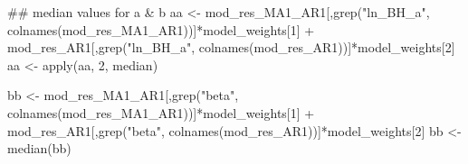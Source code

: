 \documentclass[
  11pt,
]{article}
\newenvironment{Shaded}{}{}
\newcommand{\CommentTok}[1]{\textcolor[rgb]{0.00,0.50,0.00}{#1}}
\newcommand{\DecValTok}[1]{#1}
\newcommand{\KeywordTok}[1]{\textcolor[rgb]{0.00,0.00,1.00}{#1}}
\newcommand{\NormalTok}[1]{#1}
\newcommand{\OperatorTok}[1]{#1}
\newcommand{\StringTok}[1]{\textcolor[rgb]{0.00,0.50,0.50}{#1}}
\begin{document}
\begin{Shaded}
\begin{Highlighting}[]
\CommentTok{## median values for a & b}
\NormalTok{aa <-}\StringTok{ }\NormalTok{mod_res_MA1_AR1[,}\KeywordTok{grep}\NormalTok{(}\StringTok{"ln_BH_a"}\NormalTok{, }\KeywordTok{colnames}\NormalTok{(mod_res_MA1_AR1))]}\OperatorTok{*}\NormalTok{model_weights[}\DecValTok{1}\NormalTok{] }\OperatorTok{+}\StringTok{ }\NormalTok{mod_res_AR1[,}\KeywordTok{grep}\NormalTok{(}\StringTok{"ln_BH_a"}\NormalTok{, }\KeywordTok{colnames}\NormalTok{(mod_res_AR1))]}\OperatorTok{*}\NormalTok{model_weights[}\DecValTok{2}\NormalTok{] }
\NormalTok{aa <-}\StringTok{ }\KeywordTok{apply}\NormalTok{(aa, }\DecValTok{2}\NormalTok{, median)}

\NormalTok{bb <-}\StringTok{ }\NormalTok{mod_res_MA1_AR1[,}\KeywordTok{grep}\NormalTok{(}\StringTok{"beta"}\NormalTok{, }\KeywordTok{colnames}\NormalTok{(mod_res_MA1_AR1))]}\OperatorTok{*}\NormalTok{model_weights[}\DecValTok{1}\NormalTok{] }\OperatorTok{+}\StringTok{ }\NormalTok{mod_res_AR1[,}\KeywordTok{grep}\NormalTok{(}\StringTok{"beta"}\NormalTok{, }\KeywordTok{colnames}\NormalTok{(mod_res_AR1))]}\OperatorTok{*}\NormalTok{model_weights[}\DecValTok{2}\NormalTok{] }
\NormalTok{bb <-}\StringTok{ }\KeywordTok{median}\NormalTok{(bb)}


\end{Highlighting}
\end{Shaded}
\end{document}
